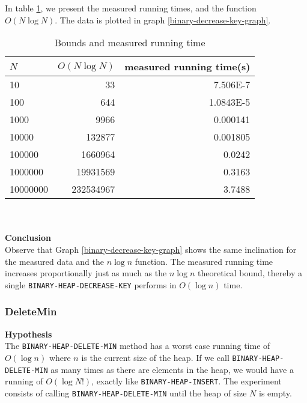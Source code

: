 \documentclass[a4paper,10pt]{article}
\begin{document}
In table \ref{binary-decrease-key}, we present the measured running times, and the function $O(N\log N)$. The data is plotted in graph \ref{binary-decrease-key-graph}.
\begin{table}
  \begin{center}
    \begin{tabular}{l|r|r}
      $N$ & $O(N\log N)$ & measured running time(s)\\
      \hline
      10       & 33         & \num{7.506E-7}\\
      100      & 644        & \num{1.0843E-5}\\
      1000     & 9966       & \num{0.000141}\\
      10000    & 132877     & \num{0.001805}\\
      100000   & 1660964    & \num{0.0242}\\
      1000000  & 19931569   & \num{0.3163}\\
      10000000 & 232534967  & \num{3.7488}
    \end{tabular}
    \caption{Bounds and measured running time}
    \label{binary-decrease-key}
  \end{center}
\end{table}\\\\
{\bf Conclusion}\\
Observe that Graph \ref{binary-decrease-key-graph} shows the same inclination for the measured data and the $n\log n$ function. The measured running time increases proportionally just as much as the $n\log n$ theoretical bound, thereby a single \texttt{BINARY\--HEAP\--DECREASE\--KEY} performs in $O(\log n)$ time.

\subsubsection{DeleteMin}
{\bf Hypothesis}\\
The \texttt{BINARY\--HEAP\--DELETE\--MIN} method has a worst case running time of $O(\log n)$ where $n$ is the current size of the heap. If we call \texttt{BINARY\--HEAP\--DELETE\--MIN} as many times as there are elements in the heap, we would have a running of $O(\log N!)$, exactly like \texttt{BINARY\--HEAP\--INSERT}. The experiment consists of calling \texttt{BINARY\--HEAP\--DELETE\--MIN} until the heap of size $N$ is empty.
\end{document}
